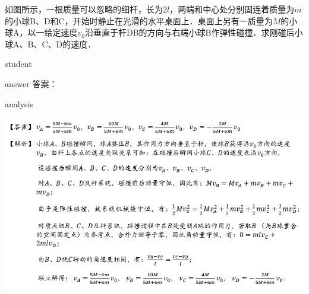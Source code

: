 \begin{example}
	如图所示，一根质量可以忽略的细杆，长为$ 2l $，两端和中心处分别固连着质量为$ m $的小球B、D和C，开始时静止在光滑的水平桌面上．桌面上另有一质量为$ M $的小球A，以一给定速度$ v_0 $沿垂直于杆DB的方向与右端小球B作弹性碰撞．求刚碰后小球A、B、C、D的速度．
	
	\begin{taggedblock}{student}
		\vspace*{2cm}
	\end{taggedblock}
	
	
	\begin{taggedblock}{answer}
		答案：
	\end{taggedblock}
	
	
	\begin{taggedblock}{analysis}
		\begin{center}
\includegraphics[width=0.9\linewidth]{image/am-15}
\end{center}

	\end{taggedblock}
\end{example}


